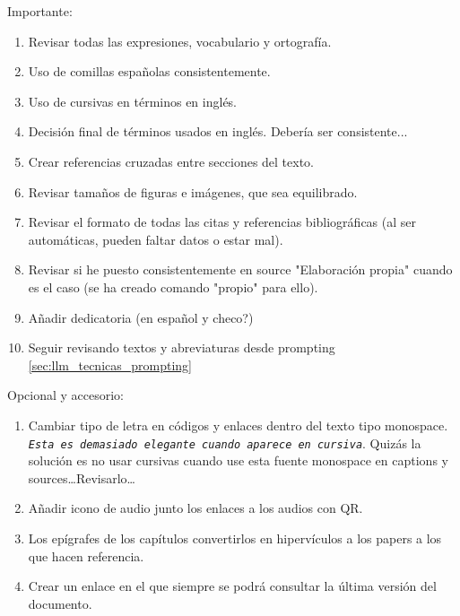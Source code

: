 
\newpage
\pagecolor{yellow!30}
Importante:
  \begin{enumerate}
    \item Revisar todas las expresiones, vocabulario y ortografía.
    \item Uso de comillas españolas consistentemente.
    \item Uso de cursivas en términos en inglés.
    \item Decisión final de términos usados en inglés. Debería ser consistente...
    \item Crear referencias cruzadas entre secciones del texto.
    \item Revisar tamaños de figuras e imágenes, que sea equilibrado.
    \item Revisar el formato de todas las citas y referencias bibliográficas (al ser automáticas, pueden faltar datos o estar mal).
    \item Revisar si he puesto consistentemente en source "Elaboración propia" cuando es el caso (se ha creado comando "propio" para ello).
    \item Añadir dedicatoria (en español y checo?) %
    \item Seguir revisando textos y abreviaturas desde prompting \ref{sec:llm_tecnicas_prompting}
  \end{enumerate}

  
  Opcional y accesorio:
  \begin{enumerate}
    \item Cambiar tipo de letra en códigos y enlaces dentro del texto tipo monospace. \texttt{\textit{Esta es demasiado elegante cuando aparece en cursiva}}. Quizás la solución es no usar cursivas cuando use esta fuente monospace en captions y sources\dots Revisarlo\dots
    \item Añadir icono de audio junto los enlaces a los audios con QR.
    \item Los epígrafes de los capítulos convertirlos en hipervículos a los papers a los que hacen referencia.
    \item Crear un enlace en el que siempre se podrá consultar la última versión del documento.
  \end{enumerate}




